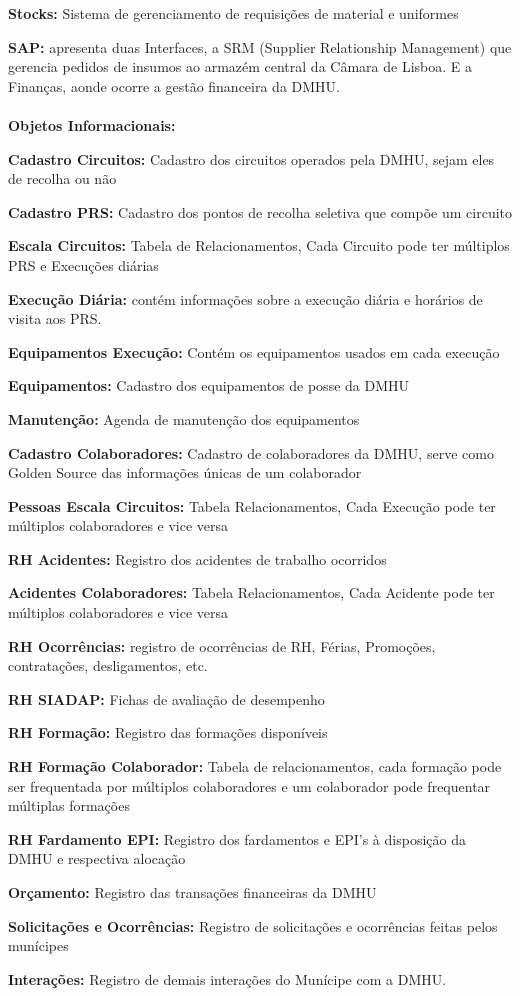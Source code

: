 \documentclass[12pt,a4paper,final]{article}
\begin{document}
    \textbf{Stocks:} Sistema de gerenciamento de requisições de material e uniformes

    \textbf{SAP:} apresenta duas Interfaces, a SRM (Supplier Relationship Management) que gerencia pedidos de insumos ao armazém central da Câmara de Lisboa. E a Finanças, aonde ocorre a gestão financeira da DMHU.
\\
    \\
    \textbf{Objetos Informacionais:}

    \textbf{Cadastro Circuitos:} Cadastro dos circuitos operados pela DMHU, sejam eles de recolha ou não

    \textbf{Cadastro PRS:} Cadastro dos pontos de recolha seletiva que compõe um circuito

    \textbf{Escala Circuitos:} Tabela de Relacionamentos, Cada Circuito pode ter múltiplos PRS e Execuções diárias

    \textbf{Execução Diária:} contém informações sobre a execução diária e horários de visita aos PRS.

    \textbf{Equipamentos Execução:} Contém os equipamentos usados em cada execução

    \textbf{Equipamentos:} Cadastro dos equipamentos de posse da DMHU

    \textbf{Manutenção:} Agenda de manutenção dos equipamentos

    \textbf{Cadastro Colaboradores:} Cadastro de colaboradores da DMHU, serve como Golden Source das informações únicas de um colaborador

    \textbf{Pessoas Escala Circuitos:} Tabela Relacionamentos, Cada Execução pode ter múltiplos colaboradores e vice versa

    \textbf{RH Acidentes:} Registro dos acidentes de trabalho ocorridos

    \textbf{Acidentes Colaboradores:} Tabela Relacionamentos, Cada Acidente pode ter múltiplos colaboradores e vice versa

    \textbf{RH Ocorrências:} registro de ocorrências de RH, Férias, Promoções, contratações, desligamentos, etc.

    \textbf{RH SIADAP:} Fichas de avaliação de desempenho

    \textbf{RH Formação:} Registro das formações disponíveis

    \textbf{RH Formação Colaborador:} Tabela de relacionamentos, cada formação pode ser frequentada por múltiplos colaboradores e um colaborador pode frequentar múltiplas formações

    \textbf{RH Fardamento EPI:} Registro dos fardamentos e EPI’s à disposição da DMHU e respectiva alocação

    \textbf{Orçamento:} Registro das transações financeiras da DMHU

    \textbf{Solicitações e Ocorrências:} Registro de solicitações e ocorrências feitas pelos munícipes

    \textbf{Interações:} Registro de demais interações do Munícipe com a DMHU.

    \newpage
    \nocite{*}
    \printbibliography
\end{document}
